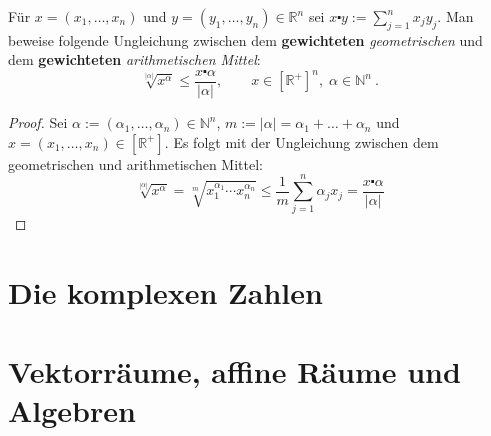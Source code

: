 \begin{aufgabe}
	Für $x = (x_1, \ldots, x_n)$ und $y = (y_1, \ldots, y_n) \in \mathbb R^n$ sei 
	$x \centerdot y := \sum_{j=1}^n x_j y_j$. Man beweise folgende Ungleichung
	zwischen dem \textbf{gewichteten} \textit{geometrischen} und dem \textbf{gewichteten}
	\textit{arithmetischen Mittel}:
	\[
		\sqrt[|\alpha|]{x^\alpha} \leq \frac{x \centerdot \alpha}{|\alpha|}, 
		\qquad x \in \left[ \mathbb R^+ \right]^n, \; \alpha \in \mathbb N^n \ .
	\]
\end{aufgabe}
\begin{proof}
Sei $\alpha := ( \alpha_1, \dots, \alpha_n) \in \mathbb N^n$, 
$m := | \alpha | = \alpha_1 + \dots + \alpha_n$
und $x = (x_1, \dots, x_n) \in \left[ \mathbb R^+ \right]$. Es folgt
mit der Ungleichung zwischen dem geometrischen und arithmetischen Mittel:
\[
	\sqrt[|\alpha|]{x^\alpha}
	= \sqrt[m]{x_1^{\alpha_1} \cdots x_n^{\alpha_n}}
	\leq \frac 1 m \sum_{j=1}^n \alpha_j x_j
	= \frac{x \centerdot \alpha}{|\alpha|}
\]

\end{proof}

\section{Die komplexen Zahlen}
\section{Vektorräume, affine Räume und Algebren}
